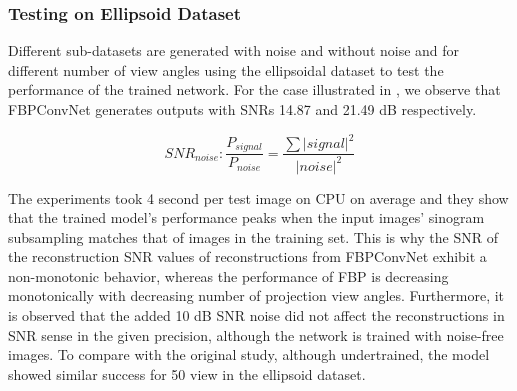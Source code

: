 \documentclass[journal, onecolumn, 11pt]{IEEEtran}
\begin{document}
\vfill\null\newpage
\subsubsection{Testing on Ellipsoid Dataset}

Different sub-datasets are generated with noise and without noise and for different number of view angles using the ellipsoidal dataset to test the performance of the trained network. For the case illustrated in , we observe that FBPConvNet generates outputs with SNRs 14.87 and 21.49 dB respectively. 


\begin{table}[h]
\caption{\label{tab:tabname}Experiment results for training configuration described in . \newline * Noise SNR is described in }
\end{table}

\begin{equation}
    SNR_{noise}: \frac{P_{signal}}{P_{noise}} = \frac{\sum |signal|^2}{|noise|^2
    \label{eq:noisesnr}} 
\end{equation}

The experiments took 4 second per test image on CPU on average and they show that the trained model's performance peaks when  
the input images' sinogram subsampling matches that of images in the training set. This is why the SNR of the reconstruction SNR values of reconstructions from FBPConvNet exhibit a non-monotonic behavior, whereas the performance of FBP is decreasing monotonically with decreasing number of projection view angles. Furthermore, it is observed that the added 10 dB SNR noise did not affect the reconstructions in SNR sense in the given precision, although the network is trained with noise-free images. To compare with the original study, although undertrained, the model showed similar success for 50 view in the ellipsoid dataset. 
\end{document}

